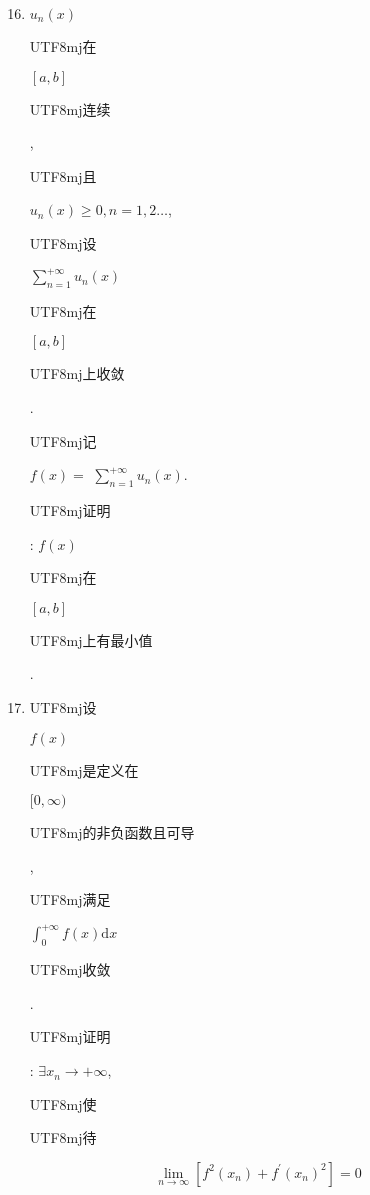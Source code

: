 \documentclass[10pt]{article}
\begin{document}
\begin{enumerate}
  \setcounter{enumi}{15}
  \item $u_{n}(x)$ \begin{CJK}{UTF8}{mj}在\end{CJK} $[a, b]$ \begin{CJK}{UTF8}{mj}连续\end{CJK}, \begin{CJK}{UTF8}{mj}且\end{CJK} $u_{n}(x) \geq 0, n=1,2 \ldots$, \begin{CJK}{UTF8}{mj}设\end{CJK} $\sum_{n=1}^{+\infty} u_{n}(x)$ \begin{CJK}{UTF8}{mj}在\end{CJK} $[a, b]$ \begin{CJK}{UTF8}{mj}上收敛\end{CJK}. \begin{CJK}{UTF8}{mj}记\end{CJK} $f(x)=$ $\sum_{n=1}^{+\infty} u_{n}(x)$. \begin{CJK}{UTF8}{mj}证明\end{CJK}: $f(x)$ \begin{CJK}{UTF8}{mj}在\end{CJK} $[a, b]$ \begin{CJK}{UTF8}{mj}上有最小值\end{CJK}.

  \item \begin{CJK}{UTF8}{mj}设\end{CJK} $f(x)$ \begin{CJK}{UTF8}{mj}是定义在\end{CJK} $[0, \infty)$ \begin{CJK}{UTF8}{mj}的非负函数且可导\end{CJK}, \begin{CJK}{UTF8}{mj}满足\end{CJK} $\int_{0}^{+\infty} f(x) \mathrm{d} x$ \begin{CJK}{UTF8}{mj}收敛\end{CJK}. \begin{CJK}{UTF8}{mj}证明\end{CJK}: $\exists x_{n} \rightarrow+\infty$, \begin{CJK}{UTF8}{mj}使\end{CJK} \begin{CJK}{UTF8}{mj}待\end{CJK}

\end{enumerate}
$$
\lim _{n \rightarrow \infty}\left[f^{2}\left(x_{n}\right)+f^{\prime}\left(x_{n}\right)^{2}\right]=0
$$
\end{document}
